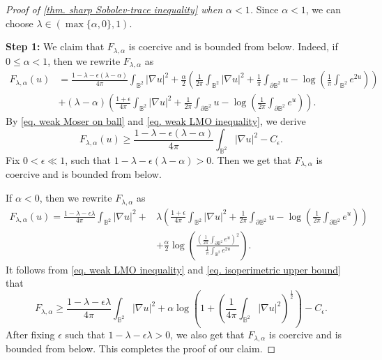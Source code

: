 \documentclass[11pt,a4paper,twoside]{amsart}
\newtheorem{sketch proof}{Sketch of the proof}[section]
\begin{document}
    \begin{proof}[Proof of \cref{thm. sharp Sobolev-trace inequality} when $\alpha<1$]
        Since $\alpha<1$, we can choose $\lambda\in(\max\{\alpha,0\},1)$.
        
        {\bf Step 1:} We claim that $F_{\lambda,\alpha}$ is coercive and is bounded from below.     
        Indeed, if $0\leq \alpha<1$, then we rewrite $F_{\lambda,\alpha}$ as
        \begin{align*}
            F_{\lambda,\alpha}(u)
        &= \frac{1-\lambda-\epsilon(\lambda-\alpha)}{4\pi}
        \int_{\mathbb{B}^2}|\nabla u|^2
        +\frac{\alpha}{2}\left(
        \frac{1}{2\pi}
        \int_{\mathbb{B}^2}|\nabla u|^2
        +\frac{1}{\pi}
        \int_{\partial \mathbb{B}^2}u
        -\log\left(\frac{1}{\pi}\int_{\mathbb{B}^2}e^{2u}\right)
        \right)\\
        & +(\lambda-\alpha)
        \left(
        \frac{1+\epsilon}{4\pi}
        \int_{\mathbb{B}^2}|\nabla u|^2
        +\frac{1}{2\pi}
        \int_{\partial \mathbb{B}^2}u
        -\log\left(\frac{1}{2\pi}
        \int_{\partial\mathbb{B}^2}e^{u}\right)
        \right).
        \end{align*}
        By \cref{eq. weak Moser on ball} and \cref{eq. weak LMO inequality}, we derive
        \[
        F_{\lambda,\alpha}(u)
        \geq \frac{1-\lambda-\epsilon(\lambda-\alpha)}{4\pi}
        \int_{\mathbb{B}^2}|\nabla u|^2
        -C_\epsilon.
        \]
        Fix $0<\epsilon\ll 1$, such that $1-\lambda-\epsilon(\lambda-\alpha)>0$. Then we get that $F_{\lambda,\alpha}$ is coercive and is bounded from below.

        If $\alpha<0$, then we rewrite $F_{\lambda,\alpha}$ as
        \begin{align*}
            F_{\lambda,\alpha}(u)
        =\frac{1-\lambda-\epsilon\lambda}{4\pi}
        \int_{\mathbb{B}^2}|\nabla u|^2
        +&\lambda
        \left(
        \frac{1+\epsilon}{4\pi}
        \int_{\mathbb{B}^2}|\nabla u|^2
        +\frac{1}{2\pi}
        \int_{\partial \mathbb{B}^2}u
        -\log\left(\frac{1}{2\pi}
        \int_{\partial\mathbb{B}^2}e^{u}\right)
        \right)\\
        &+\frac{\alpha}{2}\log
        \left(
        \frac{\left(\frac{1}{2\pi}
        \int_{\partial\mathbb{B}^2}
        e^{u}\right)^2}{\frac{1}{\pi}\int_{\mathbb{B}^2}e^{2u}}
        \right).
        \end{align*}
        It follows from \cref{eq. weak LMO inequality} and \cref{eq. isoperimetric upper bound} that
        \[
        F_{\lambda,\alpha}
        \geq \frac{1-\lambda-\epsilon\lambda}{4\pi}
        \int_{\mathbb{B}^2}|\nabla u|^2
        +\alpha\log\left(
        1+\left(\frac{1}{4\pi}\int_{\mathbb{B}^2}|\nabla u|^2\right)^{\frac{1}{2}}
        \right)
        -C_\epsilon.
        \]
        After fixing $\epsilon$ such that $1-\lambda-\epsilon\lambda>0$, we also get that $F_{\lambda,\alpha}$ is coercive and is bounded from below. This completes the proof of our claim.


\end{proof}
\end{document}
